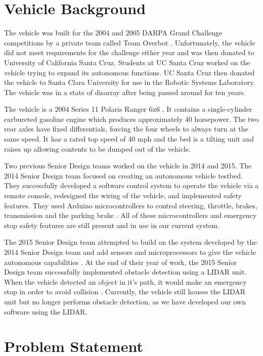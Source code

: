 \section{Vehicle Background}
The vehicle was built for the 2004 and 2005 DARPA Grand Challenge competitions by a private team called Team Overbot \cite{rslrover2014}.  Unfortunately, the vehicle did not meet requirements for the challenge either year and was then donated to University of California Santa Cruz.  Students at UC Santa Cruz worked on the vehicle trying to expand its autonomous functions.   UC Santa Cruz then donated the vehicle to Santa Clara University for use in the Robotic Systems Laboratory.  The vehicle was in a state of disarray after being passed around for ten years.  

The vehicle is a 2004 Series 11 Polaris Ranger 6x6 \cite{rslrover2014}.  It contains a single-cylinder carbureted gasoline engine which produces approximately 40 horsepower.  The two rear axles have fixed differentials, forcing the four wheels to always turn at the same speed.  It has a rated top speed of 40 mph and the bed is a tilting unit and raises up allowing contents to be dumped out of the vehicle.  

Two previous Senior Design teams worked on the vehicle in 2014 and 2015.  The 2014 Senior Design team focused on creating an autonomous vehicle testbed.  They successfully developed a software control system to operate the vehicle via a remote console, redesigned the wiring of the vehicle, and implemented safety features.  They used Arduino microcontrollers to control steering, throttle, brakes, transmission and the parking brake \cite{rslrover2014}.  All of these microcontrollers and emergency stop safety features are still present and in use in our current system.

The 2015 Senior Design team attempted to build on the system developed by the 2014 Senior Design team and add sensors and microprocessors to  give the vehicle autonomous capabilities \cite{rslrover2015}.  At the end of their year of work, the 2015 Senior Design team successfully implemented obstacle detection using a LIDAR unit.  When the vehicle detected an object in it's path, it would make an emergency stop in order to avoid collision \cite{rslrover2015}. Currently, the vehicle still houses the LIDAR unit but no longer performs obstacle detection, as we have developed our own software using the LIDAR. 

\section{Problem Statement}


